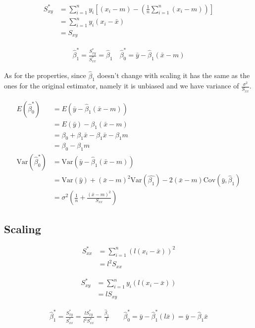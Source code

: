 \documentclass{article}\usepackage[]{graphicx}\usepackage[]{color}
\newcommand{\Var}{\mathrm{Var}}
\newcommand{\Cov}{\mathrm{Cov}}
\begin{document}
	\begin{align*}
		S_{xy}^* &= \sum_{i=1}^{n}y_i\left[(x_i - m) - (\frac{1}{n}\sum_{i=1}^{n} (x_i- m)) \right] \\
		&= \sum_{i=1}^{n} y_i(x_i - \bar{x})\\
		&= S_{xy}
	\end{align*}
 
	
	\begin{align*}
		\hat{\beta}_1^* = \frac{S_{xy}^*}{S_{xx}^*} = \hat\beta_1 \quad \hat\beta_0^* = \bar{y} - \hat\beta_1(\bar x - m)
	\end{align*}
	
		
	As for the properties, since $\hat\beta_1$ doesn't change with scaling it has the same as the ones for the original estimator, namely it is unbiased and we have variance of $\frac{\sigma^2}{S_{xx}}$.
	
	\begin{align*}
		E(\hat\beta_0 ^*) &= E(\bar y - \hat\beta_1 (\bar x - m))\\
		&= E(\bar y) - \beta_1(\bar x - m )\\
		&= \beta_0 + \beta_1 \bar x  - \beta_1\bar x - \beta _1 m\\
		&= \beta_0 - \beta_1 m\\[2ex]
		\Var (\hat \beta_0^* ) &=  \Var(\bar y - \hat \beta_1(\bar x -m))\\
		&= \Var (\hat y)  +(\bar x - m)^2 \Var(\hat{\beta_1}) - 2(\bar x - m)\Cov (\bar y, \hat\beta_1)\\
		&= \sigma ^2\left(\frac{1}{n}+ \frac{(\bar x - m)^2}{S_{xx}}\right)
	\end{align*}
	
\clearpage
	
\subsection{Scaling}

	\begin{align*}
	S_{xx} ^* &= \sum_{i=1}^{n}(l(x_i -\bar{x}))^2 \\[2ex]
	&= l^2 S_{xx}
	\end{align*}
		
	\begin{align*}
	S_{xy}^* &= \sum_{i=1}^{n} y_i(l(x_i - \bar{x}))\\[2ex]
	&= lS_{xy}
	\end{align*}
		
	\begin{align*}
	\hat{\beta}_1^* = \frac{S_{xy}^*}{S_{xx}^*} =\frac{lS_{xy}^*}{l^2S_{xx}^*} = \frac{\hat\beta_1}{l} \qquad \hat\beta_0^* = \bar{y} - \hat\beta_1^*(l\bar x) = \bar{y} - \hat\beta_1\bar x
	\end{align*}
\end{document}
